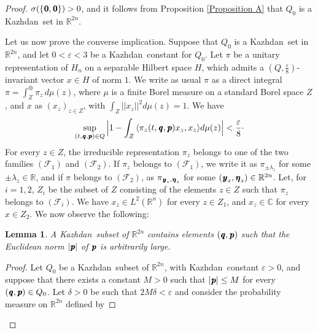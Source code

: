 \documentclass[11pt,english,a4paper]{smfart}
\numberwithin{equation}{section}
\newtheorem{lemma}[theorem]{Lemma}
\theoremstyle{definition}
\begin{document}
\begin{proof}
$\sigma (\{{\mkern 1.5 mu\pmb{0}},{\mkern 1.5 mu\pmb{0}}\})>0$, and it follows from Proposition \ref{Proposition A} that ${Q}_{0}$ is a {Kazhdan}\ set in ${\ensuremath{\mathbb R}}^{2n}$. 
\par\smallskip
Let us now prove the converse implication. Suppose that ${Q}_{0}$ is a {Kazhdan}\ set in ${\ensuremath{\mathbb R}}^{2n}$, and let $0<\varepsilon <3$ be a {Kazhdan}\ constant for  ${Q}_{0}$.  
 Let $\pi $ be a unitary representation of $H_{n}$ on a separable Hilbert space $H$, which admits a  $({Q}, \frac{\varepsilon}{8} )$-invariant vector $x\in H$ of norm $1$. We write as usual $\pi $ as a direct integral $\pi =\int_{Z}^{\oplus}\pi _{z}\,d\mu (z)$, where $\mu $ is a finite Borel measure on a standard Borel space $Z$, and $x$ as $(x_{z})_{z\in Z}$, with 
$\int_{Z}||x_{z}||^{2} d\mu (z)=1$. We have 
\begin{equation}\label{Eq17}
\sup_{(t,{\mkern 1.5 mu\pmb{q}},{\mkern 1.5 mu\pmb{p}})\in{Q}}\,\Bigl|1-\int_{Z}{\ensuremath{{\langle {\pi _{z}(t,{\mkern 1.5 mu\pmb{q}},{\mkern 1.5 mu\pmb{p}})x_{z}},{x_{z}}\rangle}}}d\mu (z)\Bigr|<\dfrac{\varepsilon}{8}\cdot 
\end{equation}
For every $z\in Z$, the irreducible representation $\pi_{z}$ belongs to one of the two families $(\mathcal{F}_{1})$ and $(\mathcal{F}_{2})$. If $\pi _{z}$ belongs to $(\mathcal{F}_{1})$, we write it as $\pi _{\pm\lambda_{z} }$ for some $\pm\lambda _{z}\in{\ensuremath{\mathbb R}}$, and if $\pi $ belongs to $(\mathcal{F}_{2})$, as $\pi _{{\mkern 1.5 mu\pmb{y}}_{z},{\mkern 1.5 mu\pmb{\eta}} _{z}}$ for some $({\mkern 1.5 mu\pmb{y}}_{z},{\mkern 1.5 mu\pmb{\eta}} _{z})\in{\ensuremath{\mathbb R}}^{2n}$. Let, for $i=1,2$, $Z_{i}$ be the subset of $Z$ consisting of the elements $z\in Z$ such that $\pi _{z}$ belongs to $(\mathcal{F}_{i})$. We have $x_{z}\in L^{2}({\ensuremath{\mathbb R}}^{n})$ for every $z\in Z_{1}$, and $x_{z}\in{\ensuremath{\mathbb C}}$ for every $x\in Z_{2}$.
We now observe the following:
\begin{lemma}\label{Lemma G}
 A {Kazhdan}\ subset of ${\ensuremath{\mathbb R}}^{2n}$ contains elements $({\mkern 1.5 mu\pmb{q}},{\mkern 1.5 mu\pmb{p}})$ such that the Euclidean norm $|{\mkern 1.5 mu\pmb{p}}|$ of ${\mkern 1.5 mu\pmb{p}}$ is arbitrarily large.
\end{lemma}
\begin{proof}
 Let ${Q}_{0}$ be a {Kazhdan}\ subset of ${\ensuremath{\mathbb R}}^{2n}$, with {Kazhdan}\ constant $\varepsilon >0$, and suppose that there exists a constant $M>0$ such that $|{\mkern 1.5 mu\pmb{p}}|\le M$ for every $({\mkern 1.5 mu\pmb{q}},{\mkern 1.5 mu\pmb{p}})\in{Q}_{0}$. Let $\delta >0$ be such that $2M\delta <\varepsilon $ and consider the probability measure on ${\ensuremath{\mathbb R}}^{2n}$ defined by 

\end{proof}
\end{proof}
\end{document}
